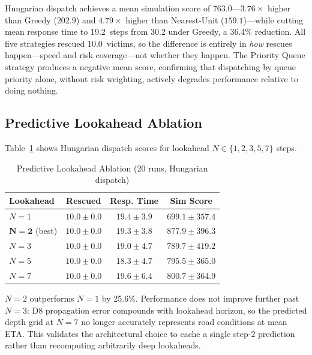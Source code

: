 \documentclass[conference]{IEEEtran}
\begin{document}
Hungarian dispatch achieves a mean simulation score of $763.0$---$3.76\times$
higher than Greedy ($202.9$) and $4.79\times$ higher than Nearest-Unit
($159.1$)---while cutting mean response time to 19.2~steps from 30.2
under Greedy, a 36.4\% reduction.
All five strategies rescued 10.0~victims, so the difference is entirely in
\emph{how} rescues happen---speed and risk coverage---not whether they happen.
The Priority Queue strategy produces a negative mean score, confirming that
dispatching by queue priority alone, without risk weighting, actively
degrades performance relative to doing nothing.

\subsection{Predictive Lookahead Ablation}
\label{subsec:ablation}

Table~\ref{tab:ablation} shows Hungarian dispatch scores for lookahead
$N \in \{1, 2, 3, 5, 7\}$ steps.

\begin{table}[!t]
  \renewcommand{\arraystretch}{1.2}
  \caption{Predictive Lookahead Ablation (20 runs, Hungarian dispatch)}
  \label{tab:ablation}
  \centering
  \begin{tabular}{lccc}
    \toprule
    \textbf{Lookahead} & \textbf{Rescued} & \textbf{Resp. Time} & \textbf{Sim Score} \\
    \midrule
    $N=1$                      & $10.0\pm0.0$ & $19.4\pm3.9$ & $699.1\pm357.4$ \\
    $\mathbf{N=2}$ (best)      & $10.0\pm0.0$ & $19.3\pm3.8$ & $\mathbf{877.9\pm396.3}$ \\
    $N=3$                      & $10.0\pm0.0$ & $19.0\pm4.7$ & $789.7\pm419.2$ \\
    $N=5$                      & $10.0\pm0.0$ & $18.3\pm4.7$ & $795.5\pm365.0$ \\
    $N=7$                      & $10.0\pm0.0$ & $19.6\pm6.4$ & $800.7\pm364.9$ \\
    \bottomrule
  \end{tabular}
\end{table}

$N=2$ outperforms $N=1$ by 25.6\%.
Performance does not improve further past $N=3$: D8 propagation error
compounds with lookahead horizon, so the predicted depth grid at $N=7$ no
longer accurately represents road conditions at mean ETA.
This validates the architectural choice to cache a single step-2 prediction
rather than recomputing arbitrarily deep lookaheads.
\end{document}
